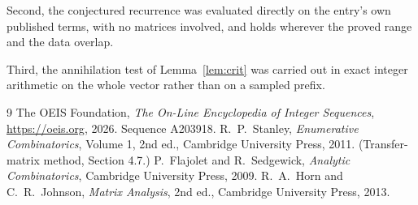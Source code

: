 \documentclass[11pt,a4paper]{article}
\theoremstyle{plain}
\theoremstyle{definition}
\begin{document}
Second, the conjectured recurrence was evaluated directly on the entry's own published terms,
with no matrices involved, and holds wherever the proved range and the data overlap.

Third, the annihilation test of Lemma~\ref{lem:crit} was carried out in exact integer
arithmetic on the whole vector rather than on a sampled prefix.

\begin{thebibliography}{9}
 The OEIS Foundation, \emph{The On-Line Encyclopedia of Integer
Sequences}, \url{https://oeis.org}, 2026. Sequence A203918.
 R.~P.~Stanley, \emph{Enumerative Combinatorics}, Volume 1, 2nd ed.,
Cambridge University Press, 2011. (Transfer-matrix method, Section 4.7.)
 P.~Flajolet and R.~Sedgewick, \emph{Analytic Combinatorics}, Cambridge
University Press, 2009.
 R.~A.~Horn and C.~R.~Johnson, \emph{Matrix Analysis}, 2nd ed., Cambridge
University Press, 2013.
\end{thebibliography}
\end{document}
